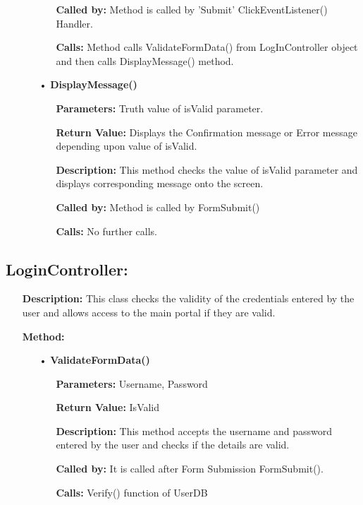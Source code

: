 \documentclass{scrreprt}
\begin{document}
\begin{enumerate}
\begin{itemize}
\begin{itemize}
\item [] \textbf{Called by:} Method is called by 'Submit' ClickEventListener() Handler.
\item [] \textbf{Calls:} Method calls ValidateFormData() from LogInController object and then calls DisplayMessage() method.
\end{itemize}
\item [•] \textbf{DisplayMessage()}
\begin{itemize}
\item [] \textbf{Parameters:} Truth value of isValid parameter.
\item [] \textbf{Return Value:} Displays the Confirmation message or Error message depending upon value of isValid. 
\item [] \textbf{Description:} This method checks the value of isValid parameter and displays corresponding message onto the screen.
\item [] \textbf{Called by:} Method is called by FormSubmit()
\item [] \textbf{Calls:} No further calls.
\end{itemize}
\end{itemize}
\end{enumerate}

\subsection{LoginController: }
\begin{enumerate}
\item[] \textbf{Description:} This class checks the validity of the credentials entered by the user and allows access to the main portal if they are valid.
\item[] \textbf{Method:}
\begin{itemize}
\item [•] \textbf{ValidateFormData()}
\begin{itemize}
\item [] \textbf{Parameters:} Username, Password
\item [] \textbf{Return Value:} IsValid
\item [] \textbf{Description:} This method accepts the username and password entered by the user and checks if the details are valid.
\item [] \textbf{Called by:} It is called after Form Submission FormSubmit().
\item [] \textbf{Calls:} Verify() function of UserDB
\end{itemize}
\end{itemize}
\end{enumerate}
\end{document}
